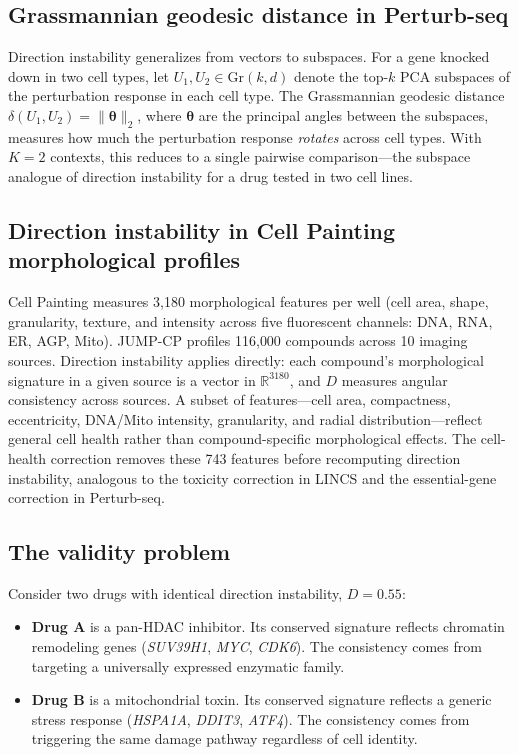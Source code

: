 \documentclass{article}
\begin{document}
\subsection{Grassmannian geodesic distance in Perturb-seq}

Direction instability generalizes from vectors to subspaces. For a gene
knocked down in two cell types, let $U_1, U_2 \in \text{Gr}(k, d)$ denote
the top-$k$ PCA subspaces of the perturbation response in each cell type.
The Grassmannian geodesic distance $\delta(U_1, U_2) =
\|\boldsymbol{\theta}\|_2$, where $\boldsymbol{\theta}$ are the principal
angles between the subspaces, measures how much the perturbation response
\emph{rotates} across cell types. With $K = 2$ contexts, this reduces to a
single pairwise comparison---the subspace analogue of direction instability
for a drug tested in two cell lines.

\subsection{Direction instability in Cell Painting morphological profiles}

Cell Painting \citep{chandrasekaran2023jump} measures 3{,}180 morphological
features per well (cell area, shape, granularity, texture, and intensity
across five fluorescent channels: DNA, RNA, ER, AGP, Mito). JUMP-CP
profiles 116{,}000 compounds across 10 imaging sources. Direction
instability applies directly: each compound's morphological signature in a
given source is a vector in $\mathbb{R}^{3180}$, and $D$ measures angular
consistency across sources. A subset of features---cell area, compactness,
eccentricity, DNA/Mito intensity, granularity, and radial
distribution---reflect general cell health rather than compound-specific
morphological effects. The cell-health correction removes these 743 features
before recomputing direction instability, analogous to the toxicity
correction in LINCS and the essential-gene correction in Perturb-seq.

\subsection{The validity problem}

Consider two drugs with identical direction instability, $D = 0.55$:

\begin{itemize}
  \item \textbf{Drug A} is a pan-HDAC inhibitor. Its conserved signature
    reflects chromatin remodeling genes (\emph{SUV39H1}, \emph{MYC},
    \emph{CDK6}). The consistency comes from targeting a universally
    expressed enzymatic family.
  \item \textbf{Drug B} is a mitochondrial toxin. Its conserved signature
    reflects a generic stress response (\emph{HSPA1A}, \emph{DDIT3},
    \emph{ATF4}). The consistency comes from triggering the same damage
    pathway regardless of cell identity.
\end{itemize}
\end{document}
